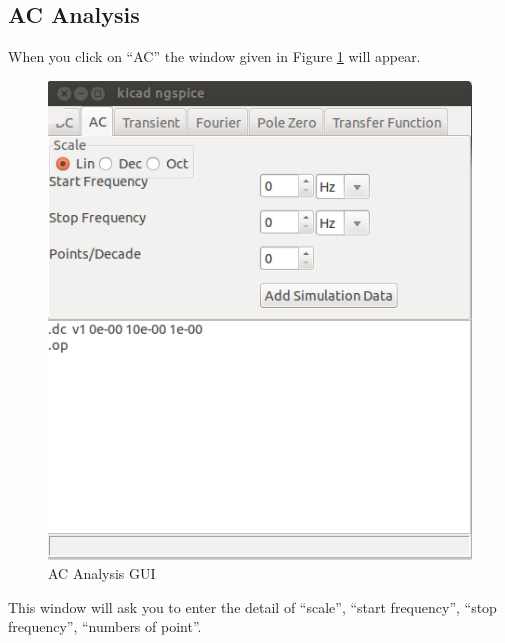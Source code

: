 \subsection{AC Analysis}
When you click on “AC” the window given in Figure \ref{4} will appear.
\begin{figure}
\centering
\includegraphics[width=\textwidth]{figures/4}
\caption{AC Analysis GUI}
\label{4}
\end{figure}
This window will ask you to enter the detail of “scale”, “start frequency”, “stop frequency”, “numbers of point”.

